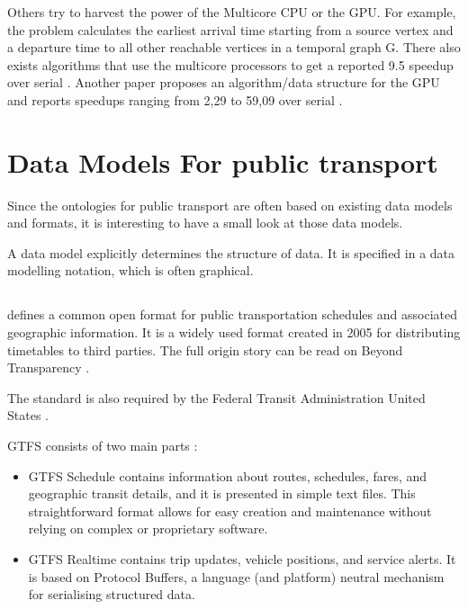 Others try to harvest the power of the Multicore CPU or the GPU. For example, the  problem calculates the earliest arrival time starting from a source vertex and a departure time to all other reachable vertices in a temporal graph G. There also exists algorithms that use the multicore processors to get a reported 9.5 speedup over serial  \cite{ni_parallel_2017}. Another paper proposes an algorithm/data structure for the GPU and reports speedups ranging from 2,29 to 59,09 over serial  \cite{haryan_gpu_2020}.


\section{Data Models For public transport}\label{section:data_model_rel_work}

Since the ontologies for public transport are often based on existing data models and formats, it is interesting to have a small look at those data models.

A data model explicitly determines the structure of data. It is specified in a data modelling notation, which is often graphical.

\subsection{}
 defines a common open format for public transportation schedules and associated geographic information. It is a widely used format created in 2005 for distributing timetables to third parties. The full origin story can be read on Beyond Transparency \cite{noauthor_pioneering_nodate}.

The standard is also required by the Federal Transit Administration United States \cite{noauthor_national_2023}. 

GTFS consists of two main parts \cite{noauthor_general_nodate}:
\begin{itemize}
    \item GTFS Schedule contains information about routes, schedules, fares, and geographic transit details, and it is presented in simple text files. This straightforward format allows for easy creation and maintenance without relying on complex or proprietary software.
    \item GTFS Realtime contains trip updates, vehicle positions, and service alerts. It is based on Protocol Buffers, a language (and platform) neutral mechanism for serialising structured data.
\end{itemize}

